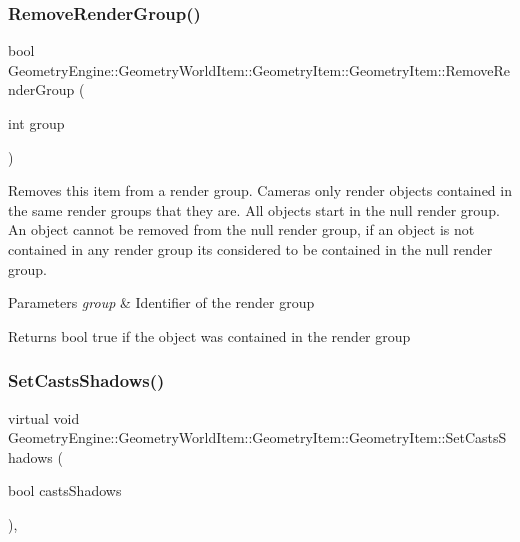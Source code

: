 \subsubsection{\texorpdfstring{RemoveRenderGroup()}{RemoveRenderGroup()}}
{\footnotesize\ttfamily bool Geometry\+Engine\+::\+Geometry\+World\+Item\+::\+Geometry\+Item\+::\+Geometry\+Item\+::\+Remove\+Render\+Group (\begin{DoxyParamCaption}\item[{int}]{group }\end{DoxyParamCaption})\hspace{0.3cm}{\ttfamily [virtual]}}

Removes this item from a render group. Cameras only render objects contained in the same render groups that they are. All objects start in the null render group. An object cannot be removed from the null render group, if an object is not contained in any render group it\textquotesingle{}s considered to be contained in the null render group. 
\begin{DoxyParams}{Parameters}
{\em group} & Identifier of the render group \\
\hline
\end{DoxyParams}
\begin{DoxyReturn}{Returns}
bool true if the object was contained in the render group 
\end{DoxyReturn}
\mbox{\label{class_geometry_engine_1_1_geometry_world_item_1_1_geometry_item_1_1_geometry_item_a3851222930b03bafdf0338df339022d2}} 
\subsubsection{\texorpdfstring{SetCastsShadows()}{SetCastsShadows()}}
{\footnotesize\ttfamily virtual void Geometry\+Engine\+::\+Geometry\+World\+Item\+::\+Geometry\+Item\+::\+Geometry\+Item\+::\+Set\+Casts\+Shadows (\begin{DoxyParamCaption}\item[{bool}]{casts\+Shadows }\end{DoxyParamCaption})\hspace{0.3cm}{\ttfamily [inline]}, {\ttfamily [virtual]}}

